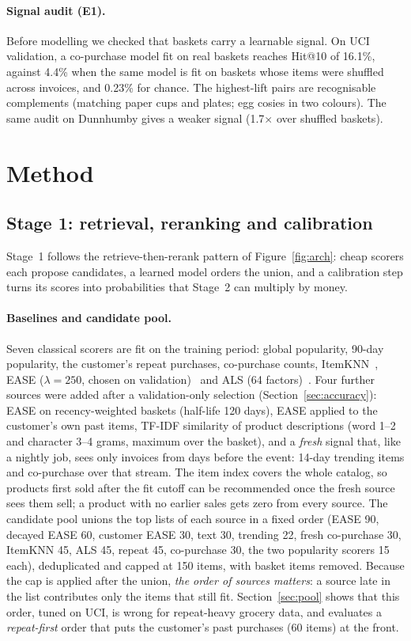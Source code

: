 \documentclass[11pt]{article}
\begin{document}
\paragraph{Signal audit (E1).}
Before modelling we checked that baskets carry a learnable signal.
On UCI validation, a co-purchase model fit on real baskets reaches Hit@10 of 16.1\%, against 4.4\% when the same model is fit on baskets whose items were shuffled across invoices, and 0.23\% for chance.
The highest-lift pairs are recognisable complements (matching paper cups and plates; egg cosies in two colours).
The same audit on Dunnhumby gives a weaker signal (1.7$\times$ over shuffled baskets).

\section{Method}

\subsection{Stage 1: retrieval, reranking and calibration}
Stage~1 follows the retrieve-then-rerank pattern of Figure~\ref{fig:arch}: cheap scorers each propose candidates, a learned model orders the union, and a calibration step turns its scores into probabilities that Stage~2 can multiply by money.

\paragraph{Baselines and candidate pool.}
Seven classical scorers are fit on the training period: global popularity, 90-day popularity, the customer's repeat purchases, co-purchase counts, ItemKNN~\citep{sarwar2001itemcf}, EASE ($\lambda{=}250$, chosen on validation)~\citep{steck2019ease} and ALS (64 factors)~\citep{hu2008implicit}.
Four further sources were added after a validation-only selection (Section~\ref{sec:accuracy}): EASE on recency-weighted baskets (half-life 120 days), EASE applied to the customer's own past items, TF-IDF similarity of product descriptions (word 1--2 and character 3--4 grams, maximum over the basket), and a \emph{fresh} signal that, like a nightly job, sees only invoices from days before the event: 14-day trending items and co-purchase over that stream.
The item index covers the whole catalog, so products first sold after the fit cutoff can be recommended once the fresh source sees them sell; a product with no earlier sales gets zero from every source.
The candidate pool unions the top lists of each source in a fixed order (EASE 90, decayed EASE 60, customer EASE 30, text 30, trending 22, fresh co-purchase 30, ItemKNN 45, ALS 45, repeat 45, co-purchase 30, the two popularity scorers 15 each), deduplicated and capped at 150 items, with basket items removed.
Because the cap is applied after the union, \emph{the order of sources matters}: a source late in the list contributes only the items that still fit.
Section~\ref{sec:pool} shows that this order, tuned on UCI, is wrong for repeat-heavy grocery data, and evaluates a \emph{repeat-first} order that puts the customer's past purchases (60 items) at the front.
\end{document}
